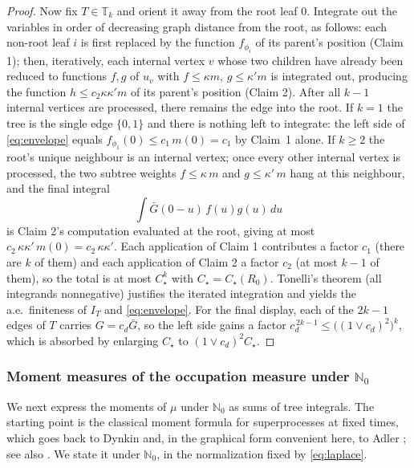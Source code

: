 \documentclass[11pt]{article}
\theoremstyle{definition}
\theoremstyle{remark}
\newcommand{\bN}{{\mathbb{N}_0}}                 %
\newcommand{\T}{\mathbb{T}}                    %
\numberwithin{equation}{section}
\theoremstyle{plain}
\theoremstyle{definition}
\theoremstyle{remark}
\theoremstyle{plain}
\begin{document}
\begin{proof}
Now fix $T\in\T_k$ and orient it away from the root leaf $0$. Integrate out
the variables in order of decreasing graph distance from the root, as
follows: each non-root leaf $i$ is first replaced by the function
$f_{\phi_i}$ of its parent's position (Claim 1); then, iteratively, each
internal vertex $v$ whose two children have already been reduced to
functions $f,g$ of $u_v$ with $f\le\kappa m$, $g\le\kappa'm$ is integrated
out, producing the function $h\le c_2\kappa\kappa' m$ of its parent's
position (Claim 2). After all $k-1$ internal vertices are processed, there
remains the edge into the root. If $k=1$ the tree is the single edge
$\{0,1\}$ and there is nothing left to integrate: the left side of
\eqref{eq:envelope} equals $f_{\phi_1}(0)\le c_1\,m(0)=c_1$ by Claim~1
alone. If $k\ge2$ the root's unique neighbour is an internal vertex; once
every other internal vertex is processed, the two subtree weights
$f\le\kappa\,m$ and $g\le\kappa'\,m$ hang at this neighbour, and the final
integral
\[
\int \bar G(0-u)\,f(u)g(u)\,du
\]
is Claim 2's computation evaluated at the root, giving at most
$c_2\,\kappa\kappa'\,m(0)=c_2\,\kappa\kappa'$. Each application of
Claim 1 contributes a factor $c_1$ (there are $k$ of them) and each
application of Claim 2 a factor $c_2$ (at most $k-1$ of them), so the total
is at most $C_\star^k$ with $C_\star=C_\star(R_0)$. Tonelli's
theorem (all integrands nonnegative) justifies the iterated integration and
yields the a.e.\ finiteness of $I_T$ and \eqref{eq:envelope}. For the final
display, each of the $2k-1$ edges of $T$ carries $G=c_d\bar G$, so the left
side gains a factor $c_d^{\,2k-1}\le\bigl((1\vee c_d)^{2}\bigr)^{k}$, which is
absorbed by enlarging $C_\star$ to $(1\vee c_d)^{2}C_\star$.
\end{proof}

\subsubsection{Moment measures of the occupation measure under $\bN$}

We next express the moments of $\mu$ under $\bN$ as sums of tree integrals.
The starting point is the classical moment formula for superprocesses at
fixed times, which goes back to Dynkin \cite{Dyn88} and, in the graphical
form convenient here, to Adler \cite[Theorem~3.1]{Adl93}; see also
\cite[Theorem 2.3]{Eth00}. We state it under $\bN$, in the normalization fixed
by \eqref{eq:laplace}.
\end{document}
